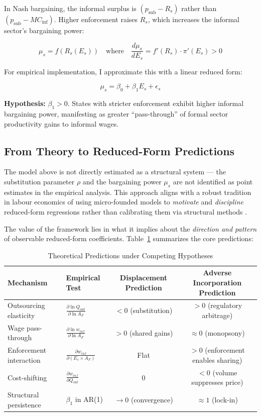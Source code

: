 In Nash bargaining, the informal surplus is $(p_{\text{sub}} - R_s)$ rather than $(p_{\text{sub}} - MC_{\text{inf}})$. Higher enforcement raises $R_s$, which increases the informal sector's bargaining power:

\begin{equation}
	\mu_s = f(R_s(E_s)) \quad \text{where} \quad \frac{d\mu_s}{dE_s} = f'(R_s) \cdot \pi'(E_s) > 0
\end{equation}

For empirical implementation, I approximate this with a linear reduced form:

\begin{equation}
	\mu_s = \beta_0 + \beta_1 E_s + \epsilon_s
\end{equation}

\textbf{Hypothesis:} $\beta_1 > 0$. States with stricter enforcement exhibit higher informal bargaining power, manifesting as greater ``pass-through'' of formal sector productivity gains to informal wages.

\subsection{From Theory to Reduced-Form Predictions}
\label{subsec:predictions}

The model above is not directly estimated as a structural system --- the substitution parameter $\rho$ and the bargaining power $\mu_s$ are not identified as point estimates in the empirical analysis. This approach aligns with a robust tradition in labour economics of using micro-founded models to \textit{motivate} and \textit{discipline} reduced-form regressions rather than calibrating them via structural methods \autocite{Angrist2010}.

The value of the framework lies in what it implies about the \textit{direction and pattern} of observable reduced-form coefficients. Table~\ref{tab:predictions} summarizes the core predictions:

\begin{table}[H]
\centering
\caption{Theoretical Predictions under Competing Hypotheses}
\label{tab:predictions}
\small
\begin{tabular}{llcc}
\toprule
Mechanism & Empirical Test & Displacement Prediction & Adverse Incorporation Prediction \\
\midrule
Outsourcing elasticity & $\frac{\partial \ln Q_{out}}{\partial \ln A_F}$ & $< 0$ (substitution) & $> 0$ (regulatory arbitrage) \\
Wage pass-through & $\frac{\partial \ln w_{inf}}{\partial \ln A_F}$ & $> 0$ (shared gains) & $\approx 0$ (monopsony) \\
Enforcement interaction & $\frac{\partial w_{inf}}{\partial (E_s \times A_F)}$ & Flat & $> 0$ (enforcement enables sharing) \\
Cost-shifting & $\frac{\partial w_{inf}}{\partial Q_{out}}$ & $0$ & $< 0$ (volume suppresses price) \\
Structural persistence & $\beta_1$ in AR(1) & $\to 0$ (convergence) & $\approx 1$ (lock-in) \\
\bottomrule
\end{tabular}
\end{table}


